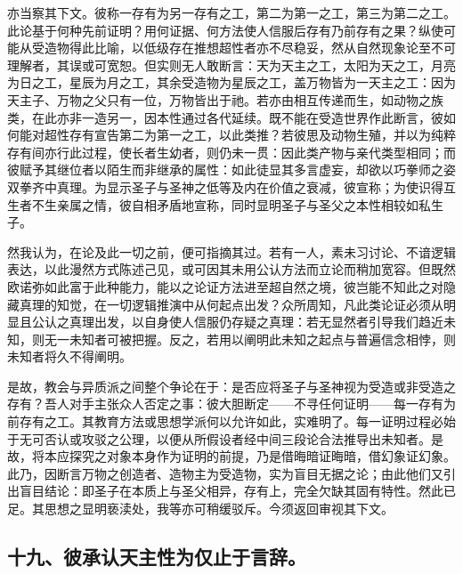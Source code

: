 亦当察其下文。彼称一存有为另一存有之工，第二为第一之工，第三为第二之工。此论基于何种先前证明？用何证据、何方法使人信服后存有乃前存有之果？纵使可能从受造物得此比喻，以低级存在推想超性者亦不尽稳妥，然从自然现象论至不可理解者，其误或可宽恕。但实则无人敢断言：天为天主之工，太阳为天之工，月亮为日之工，星辰为月之工，其余受造物为星辰之工，盖万物皆为一天主之工：因为天主子、万物之父只有一位，万物皆出于祂。若亦由相互传递而生，如动物之族类，在此亦非一造另一，因本性通过各代延续。既不能在受造世界作此断言，彼如何能对超性存有宣告第二为第一之工，以此类推？若彼思及动物生殖，并以为纯粹存有间亦行此过程，使长者生幼者，则仍未一贯：因此类产物与亲代类型相同；而彼赋予其继位者以陌生而非继承的属性：如此徒显其多言虚妄，却欲以巧拳师之姿双拳齐中真理。为显示圣子与圣神之低等及内在价值之衰减，彼宣称；为使识得互生者不生亲属之情，彼自相矛盾地宣称，同时显明圣子与圣父之本性相较如私生子。\par

然我认为，在论及此一切之前，便可指摘其过。若有一人，素未习讨论、不谙逻辑表达，以此漫然方式陈述己见，或可因其未用公认方法而立论而稍加宽容。但既然欧诺弥如此富于此种能力，能以之论证方法进至超自然之境，彼岂能不知此之对隐藏真理的知觉，在一切逻辑推演中从何起点出发？众所周知，凡此类论证必须从明显且公认之真理出发，以自身使人信服仍存疑之真理：若无显然者引导我们趋近未知，则无一未知者可被把握。反之，若用以阐明此未知之起点与普遍信念相悖，则未知者将久不得阐明。\par

是故，教会与异质派之间整个争论在于：是否应将圣子与圣神视为受造或非受造之存有？吾人对手主张众人否定之事：彼大胆断定——不寻任何证明——每一存有为前存有之工。其教育方法或思想学派何以允许如此，实难明了。每一证明过程必始于无可否认或攻驳之公理，以便从所假设者经中间三段论合法推导出未知者。是故，将本应探究之对象本身作为证明的前提，乃是借晦暗证晦暗，借幻象证幻象。此乃，因断言万物之创造者、造物主为受造物，实为盲目无据之论；由此他们又引出盲目结论：即圣子在本质上与圣父相异，存有上，完全欠缺其固有特性。然此已足。其思想之显明亵渎处，我等亦可稍缓驳斥。今须返回审视其下文。\par


\subsection{十九、彼承认天主性为仅止于言辞。}

